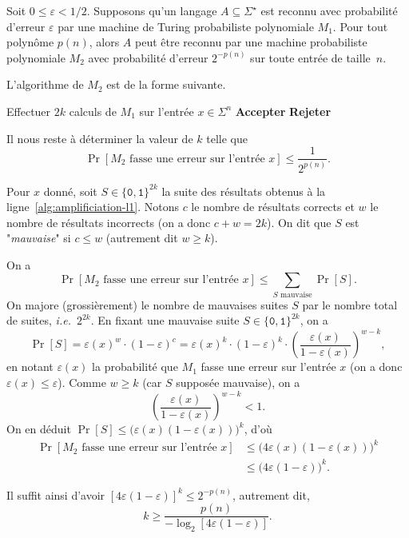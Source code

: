 \documentclass[./main]{subfiles}
\begin{document}
  \begin{lem}[d'amplification]
    Soit $0 \le \varepsilon < 1/2$.
    Supposons qu'un langage $A \subseteq \Sigma^\star$ est reconnu avec probabilité d'erreur $\varepsilon$ par une machine de Turing probabiliste polynomiale $M_1$.
    Pour tout polynôme $p(n)$, alors $A$ peut être reconnu par une machine probabiliste polynomiale $M_2$ avec probabilité d'erreur $2^{-p(n)}$ sur toute entrée de taille~$n$.
  \end{lem}
  \begin{prv}
    L'algorithme de $M_2$ est de la forme suivante.

    \begin{algorithmic}[1]
      \State Effectuer $2k$ calculs de $M_1$ sur l'entrée $x \in \Sigma^n$ \label{alg:amplificiation-l1}
      \State \textbf{Accepter}
      \Else
      \State \textbf{Rejeter}
      \EndIf
    \end{algorithmic}

    Il nous reste à déterminer la valeur de $k$ telle que 
    \[
      \Pr[\text{$M_2$ fasse une erreur sur l'entrée $x$}] \le \frac{1}{2^{p(n)}}
    .\]

    Pour $x$ donné, soit $S \in \{\texttt{0},\texttt{1}\}^{2k}$ la suite des résultats obtenus à la ligne~\ref{alg:amplificiation-l1}.
    Notons $c$ le nombre de résultats corrects et $w$ le nombre de résultats incorrects (on a donc $c + w = 2k$).
    On dit que $S$ est "\textit{mauvaise}" si $c \le w$ (autrement dit $w \ge k$).

    On a 
    \[
      \Pr[\text{$M_2$ fasse une erreur sur l'entrée $x$}] \le \sum_{S \text{ mauvaise}} \Pr[S]
    .\]
    On majore (grossièrement) le nombre de mauvaises suites $S$ par le nombre total de suites, \textit{i.e.}\ $2^{2k}$.
    En fixant une mauvaise suite $S \in \{\texttt{0},\texttt{1}\}^{2k}$, on a 
    \[
      \Pr[S] =
      \varepsilon(x)^w \cdot (1 - \varepsilon)^c = 
      \varepsilon(x)^k \cdot (1 - \varepsilon)^k \cdot \left( \frac{\varepsilon(x)}{1 - \varepsilon(x)} \right)^{w - k}
    ,\]
    en notant $\varepsilon(x)$ la probabilité que $M_1$ fasse une erreur sur l'entrée $x$ (on a donc $\varepsilon(x) \le \varepsilon$).
    Comme $w \ge k$ (car $S$ supposée mauvaise), on a 
    \[
    \left(\frac{\varepsilon(x)}{1 - \varepsilon(x)}\right)^{w-k} < 1
    .\]
    On en déduit $\Pr[S] \le \big(\varepsilon(x) (1 - \varepsilon(x))\big)^k$, d'où
    \begin{align*}
      \Pr[\text{$M_2$ fasse une erreur sur l'entrée $x$}] &{}\le \big(4 \varepsilon(x) (1-  \varepsilon(x))\big)^k\\
       &{}\le \big(4 \varepsilon (1-  \varepsilon)\big)^k
    .\end{align*}

    Il suffit ainsi d'avoir $[4 \varepsilon (1-\varepsilon)]^k \le 2^{-p(n)}$, autrement dit,
    \[
      k \ge \frac{p(n)}{-\log_2 [4 \varepsilon (1 - \varepsilon)]}
    .\]
  \end{prv}
\end{document}
